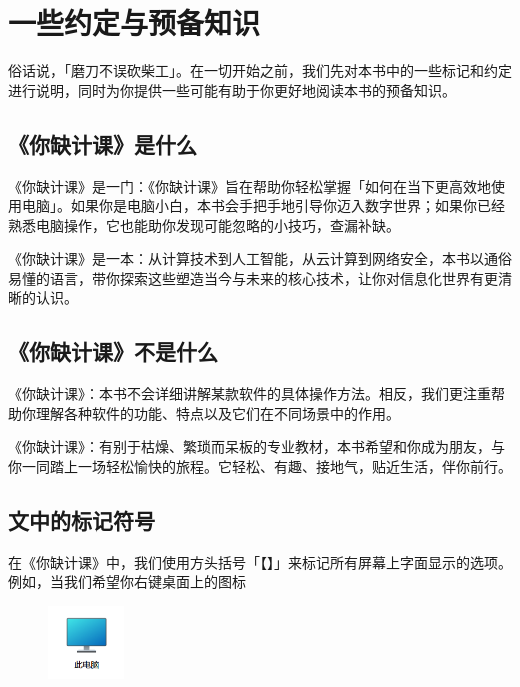 \setcounter{chapter}{-1}

\chapter{一些约定与预备知识}
\label{cha:first-things-first}

俗话说，「磨刀不误砍柴工」。在一切开始之前，我们先对本书中的一些标记和约定进行说明，同时为你提供一些可能有助于你更好地阅读本书的预备知识。

\section{《你缺计课》是什么}

《你缺计课》是一门：《你缺计课》旨在帮助你轻松掌握「如何在当下更高效地使用电脑」。如果你是电脑小白，本书会手把手地引导你迈入数字世界；如果你已经熟悉电脑操作，它也能助你发现可能忽略的小技巧，查漏补缺。

《你缺计课》是一本：从计算技术到人工智能，从云计算到网络安全，本书以通俗易懂的语言，带你探索这些塑造当今与未来的核心技术，让你对信息化世界有更清晰的认识。

\section{《你缺计课》不是什么}

《你缺计课》：本书不会详细讲解某款软件的具体操作方法。相反，我们更注重帮助你理解各种软件的功能、特点以及它们在不同场景中的作用。

《你缺计课》：有别于枯燥、繁琐而呆板的专业教材，本书希望和你成为朋友，与你一同踏上一场轻松愉快的旅程。它轻松、有趣、接地气，贴近生活，伴你前行。

\section{文中的标记符号}

在《你缺计课》中，我们使用方头括号「【】」来标记所有屏幕上字面显示的选项。例如，当我们希望你右键桌面上的图标
\begin{figure}[htb!]
  \centering
  \includegraphics[width=2cm]{assets/basic/This_PC.png}
\end{figure}

